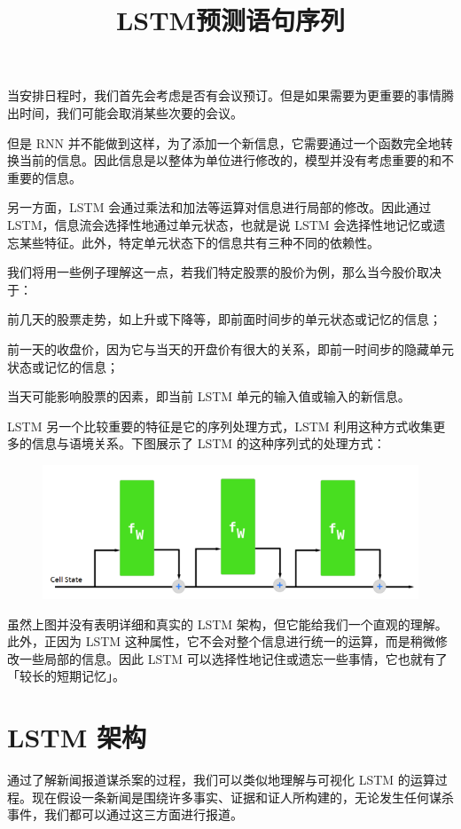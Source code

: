 \documentclass{article}
\title{LSTM预测语句序列}
\begin{document}
\maketitle
当安排日程时，我们首先会考虑是否有会议预订。但是如果需要为更重要的事情腾出时间，我们可能会取消某些次要的会议。

但是 RNN 并不能做到这样，为了添加一个新信息，它需要通过一个函数完全地转换当前的信息。因此信息是以整体为单位进行修改的，模型并没有考虑重要的和不重要的信息。

另一方面，LSTM 会通过乘法和加法等运算对信息进行局部的修改。因此通过 LSTM，信息流会选择性地通过单元状态，也就是说 LSTM 会选择性地记忆或遗忘某些特征。此外，特定单元状态下的信息共有三种不同的依赖性。

我们将用一些例子理解这一点，若我们特定股票的股价为例，那么当今股价取决于：

前几天的股票走势，如上升或下降等，即前面时间步的单元状态或记忆的信息；

前一天的收盘价，因为它与当天的开盘价有很大的关系，即前一时间步的隐藏单元状态或记忆的信息；

当天可能影响股票的因素，即当前 LSTM 单元的输入值或输入的新信息。

LSTM 另一个比较重要的特征是它的序列处理方式，LSTM 利用这种方式收集更多的信息与语境关系。下图展示了 LSTM 的这种序列式的处理方式：
\begin{figure}[H]
	\centering
	\includegraphics[scale=0.3]{1.png}
\end{figure}
虽然上图并没有表明详细和真实的 LSTM 架构，但它能给我们一个直观的理解。此外，正因为 LSTM 这种属性，它不会对整个信息进行统一的运算，而是稍微修改一些局部的信息。因此 LSTM 可以选择性地记住或遗忘一些事情，它也就有了「较长的短期记忆」。

\section{LSTM 架构}

通过了解新闻报道谋杀案的过程，我们可以类似地理解与可视化 LSTM 的运算过程。现在假设一条新闻是围绕许多事实、证据和证人所构建的，无论发生任何谋杀事件，我们都可以通过这三方面进行报道。
\end{document}
